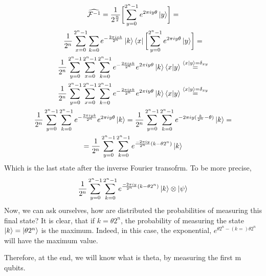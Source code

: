 \begin{gather}
  \widehat{\mathcal{F}^{-1}} = \frac{1}{2^{\frac{n}{2}}} \biggl[ \sum_{y=0}^{2^n-1} e^{2\pi i y \theta} \ket{y} \biggr]  = \\
  \frac{1}{2^n}\sum_{x=0}^{2^n-1}\sum_{k=0} e^{-\frac{2\pi ixk}{2^n}}\ket{k}\bra{x} \biggl[ \sum_{y=0}^{2^n-1} e^{2\pi i y \theta} \ket{y} \biggr] = \\
  \frac{1}{2^n} \sum_{y=0}^{2^n-1} \sum_{x=0}^{2^n-1}\sum_{k=0}^{2^n-1} e^{-\frac{2\pi ixk}{2^n}} e^{2\pi i y \theta} \ket{k}\bra{x} \ket{y} \stackrel{\bra{x}\ket{y}=\delta_{xy}}= \\
  \frac{1}{2^n} \sum_{y=0}^{2^n-1} \sum_{x=0}^{2^n-1}\sum_{k=0}^{2^n-1} e^{-\frac{2\pi ixk}{2^n}} e^{2\pi i y \theta} \ket{k}\bra{x} \ket{y} \stackrel{\bra{x}\ket{y}=\delta_{xy}}= \\
  \frac{1}{2^n} \sum_{y=0}^{2^n-1}\sum_{k=0}^{2^n-1} e^{-\frac{2\pi iyk}{2^n}} e^{2\pi i y \theta} \ket{k} = 
  \frac{1}{2^n} \sum_{y=0}^{2^n-1}\sum_{k=0}^{2^n-1} e^{-2\pi iy(\frac{k}{2^n}- \theta)} \ket{k} = \\
  = \frac{1}{2^n} \sum_{y=0}^{2^n-1}\sum_{k=0}^{2^n-1} e^{\frac{-2\pi iy}{2^n}(k - \theta 2^n)} \ket{k}
\end{gather}
Which is the last state after the inverse Fourier transofrm. To be more precise, 
\begin{gather}
  \frac{1}{2^n} \sum_{y=0}^{2^n-1}\sum_{k=0}^{2^n-1} e^{\frac{-2\pi iy}{2^n}(k - \theta 2^n)} \ket{k} \otimes \ket{\psi}
\end{gather}
Now, we can ask ourselves, how are distributed the probabilities of measuring this final state? 
It is clear, that if $k=\theta 2^n$, the probability of measuring the state $\ket{k} = \ket{\theta 2^{n}}$ is the maximum. Indeed, in this case, 
the exponential, $e^{\theta 2^n - (k=)\theta 2^n}$ will have the maximum value. 

Therefore, at the end, we will know what is theta, by measuring the first m qubits.
















